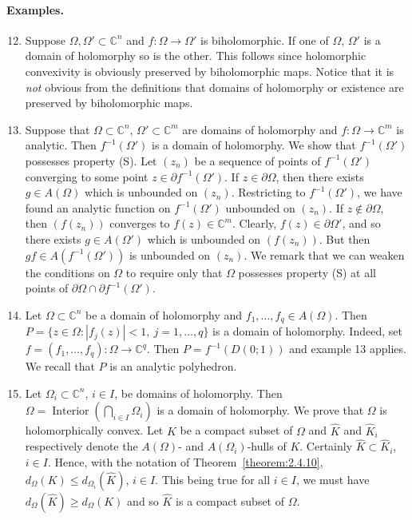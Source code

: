 \paragraph*{Examples.}
\begin{enumerate}\setcounter{enumi}{11}
\item Suppose $\Omega,\Omega'\subset\mathbb C^n$ and $f:\Omega\to\Omega'$ is biholomorphic. If one of $\Omega$, $\Omega'$ is a domain of holomorphy so is the other. This follows since holomorphic convexivity is obviously preserved by biholomorphic maps. Notice that it is \emph{not} obvious from the definitions that domains of holomorphy or existence are preserved by biholomorphic maps.
\item Suppose that $\Omega\subset\mathbb C^n$, $\Omega'\subset\mathbb C^m$ are domains of holomorphy and $f:\Omega\to\mathbb C^m$ is analytic. Then $f^{-1}(\Omega')$ is a domain of holomorphy. We show that $f^{-1}(\Omega')$ possesses property (S). Let $(z_n)$ be a sequence of points of $f^{-1}(\Omega')$ converging to some point $z\in\partial f^{-1}(\Omega')$. If $z\in\partial\Omega$, then there exists $g\in A(\Omega)$ which is unbounded on $(z_n)$. Restricting to $f^{-1}(\Omega')$, we have found an analytic function on $f^{-1}(\Omega')$ unbounded on $(z_n)$. If $z\notin\partial\Omega$, then $(f(z_n))$ converges to $f(z)\in\mathbb C^m$. Clearly, $f(z)\in\partial\Omega'$, and so there exists $g\in A(\Omega')$ which is unbounded on $(f(z_n))$. But then $gf\in A(f^{-1}(\Omega'))$ is unbounded on $(z_n)$. We remark that we can weaken the conditions on $\Omega$ to require only that $\Omega$ possesses property (S) at all points of $\partial\Omega\cap\partial f^{-1}(\Omega')$.
\item Let $\Omega\subset\mathbb C^n$ be a domain of holomorphy and $f_1,\ldots,f_q\in A(\Omega)$. Then $P=\{z\in\Omega:|f_j(z)|<1,\ j=1,\ldots,q\}$ is a domain of holomorphy. Indeed,
set $f=(f_1,\ldots,f_q):\Omega\to\mathbb C^q$. Then $P=f^{-1}(D(0;1))$ and example 13 applies. We recall that $P$ is an analytic polyhedron.
\item Let $\Omega_i\subset\mathbb C^n$, $i\in I$, be domains of holomorphy. Then $\Omega=\operatorname{Interior}(\bigcap_{i\in I}\Omega_i)$ is a domain of holomorphy. We prove that $\Omega$ is holomorphically convex. Let $K$ be a compact subset of $\Omega$ and $\widehat K$ and $\widehat K_i$ respectively denote the $A(\Omega)$- and $A(\Omega_i)$-hulls of $K$. Certainly $\widehat K\subset\widehat K_i$, $i\in I$. Hence, with the notation of Theorem~\ref{theorem:2.4.10}, $d_\Omega(K)\leq d_{\Omega_i}(\widehat K)$, $i\in I$. This being true for all $i\in I$, we must have $d_\Omega(\widehat K)\geq d_\Omega(K)$ and so $\widehat K$ is a compact subset of $\Omega$.
\end{enumerate}
